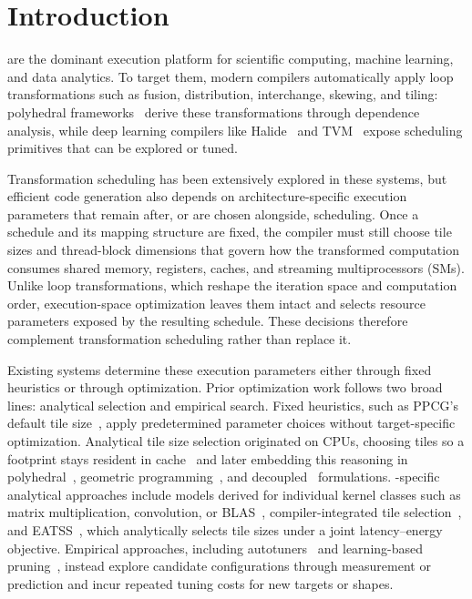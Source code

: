 \section{Introduction}
\label{sec:intro}

\gpus are the dominant execution platform for scientific computing, machine learning, and data analytics. To target them, modern compilers automatically apply loop transformations such as fusion, distribution, interchange, skewing, and tiling: polyhedral frameworks~\cite{ppcg,pluto,polly,tc,akg} derive these transformations through dependence analysis, while deep learning compilers like Halide~\cite{halide} and TVM~\cite{tvm} expose scheduling primitives that can be explored or tuned.

Transformation scheduling has been extensively explored in these systems, but efficient \gpu code generation also depends on architecture-specific execution parameters that remain after, or are chosen alongside, scheduling. Once a schedule and its mapping structure are fixed, the compiler must still choose tile sizes and thread-block dimensions that govern how the transformed computation consumes shared memory, registers, caches, and streaming multiprocessors (SMs). Unlike loop transformations, which reshape the iteration space and computation order, execution-space optimization leaves them intact and selects resource parameters exposed by the resulting schedule. These decisions therefore complement transformation scheduling rather than replace it.

Existing systems determine these execution parameters either through fixed heuristics or through optimization. Prior optimization work follows two broad lines: analytical selection and empirical search. Fixed heuristics, such as PPCG's default tile size~\cite{ppcg}, apply predetermined parameter choices without target-specific optimization. Analytical tile size selection originated on CPUs, choosing tiles so a footprint stays resident in cache~\cite{mckinley-tss,lam-tss} and later embedding this reasoning in polyhedral~\cite{pluto-tss}, geometric programming~\cite{rajopadhye-gp,rajopadhye-igp}, and decoupled~\cite{tilemind} formulations. \gpu-specific analytical approaches include models derived for individual kernel classes such as matrix multiplication, convolution, or BLAS~\cite{li-gemm,saday-conv,blis}, compiler-integrated tile selection~\cite{ppcg-tss}, and EATSS~\cite{eatss}, which analytically selects \gpu tile sizes under a joint latency--energy objective. Empirical approaches, including autotuners~\cite{metaschedule,ansor,automatichalide} and learning-based pruning~\cite{hctuner,shirako-tss,yuki-tss}, instead explore candidate configurations through measurement or prediction and incur repeated tuning costs for new targets or shapes.

